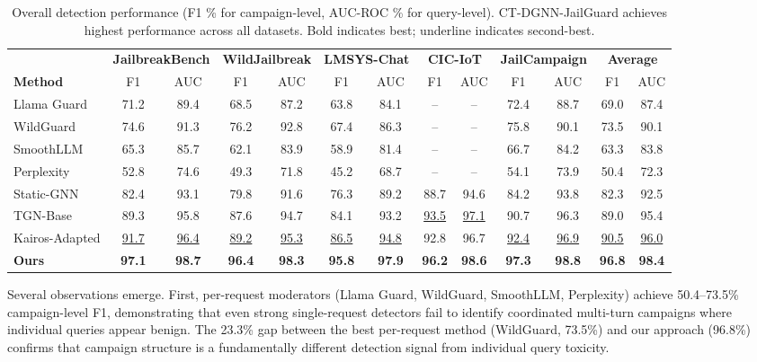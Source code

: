 \documentclass[journal]{IEEEtran}
\theoremstyle{plain}
\theoremstyle{definition}
\theoremstyle{remark}
\begin{document}
\begin{table}[t]
\centering
\caption{Overall detection performance (F1 \% for campaign-level, AUC-ROC \% for query-level). CT-DGNN-JailGuard achieves highest performance across all datasets. Bold indicates best; underline indicates second-best.}
\label{tab:overall_results}
\begin{tabular}{@{}l cc cc cc cc cc cc@{}}
\toprule
& \multicolumn{2}{c}{\textbf{JailbreakBench}} & \multicolumn{2}{c}{\textbf{WildJailbreak}} & \multicolumn{2}{c}{\textbf{LMSYS-Chat}} & \multicolumn{2}{c}{\textbf{CIC-IoT}} & \multicolumn{2}{c}{\textbf{JailCampaign}} & \multicolumn{2}{c}{\textbf{Average}} \\
\cmidrule(lr){2-3}\cmidrule(lr){4-5}\cmidrule(lr){6-7}\cmidrule(lr){8-9}\cmidrule(lr){10-11}\cmidrule(lr){12-13}
\textbf{Method} & F1 & AUC & F1 & AUC & F1 & AUC & F1 & AUC & F1 & AUC & F1 & AUC \\
\midrule
Llama Guard & 71.2 & 89.4 & 68.5 & 87.2 & 63.8 & 84.1 & -- & -- & 72.4 & 88.7 & 69.0 & 87.4 \\
WildGuard & 74.6 & 91.3 & 76.2 & 92.8 & 67.4 & 86.3 & -- & -- & 75.8 & 90.1 & 73.5 & 90.1 \\
SmoothLLM & 65.3 & 85.7 & 62.1 & 83.9 & 58.9 & 81.4 & -- & -- & 66.7 & 84.2 & 63.3 & 83.8 \\
Perplexity & 52.8 & 74.6 & 49.3 & 71.8 & 45.2 & 68.7 & -- & -- & 54.1 & 73.9 & 50.4 & 72.3 \\
Static-GNN & 82.4 & 93.1 & 79.8 & 91.6 & 76.3 & 89.2 & 88.7 & 94.6 & 84.2 & 93.8 & 82.3 & 92.5 \\
TGN-Base & 89.3 & 95.8 & 87.6 & 94.7 & 84.1 & 93.2 & \underline{93.5} & \underline{97.1} & 90.7 & 96.3 & 89.0 & 95.4 \\
Kairos-Adapted & \underline{91.7} & \underline{96.4} & \underline{89.2} & \underline{95.3} & \underline{86.5} & \underline{94.8} & 92.8 & 96.7 & \underline{92.4} & \underline{96.9} & \underline{90.5} & \underline{96.0} \\
\midrule
\textbf{Ours} & \textbf{97.1} & \textbf{98.7} & \textbf{96.4} & \textbf{98.3} & \textbf{95.8} & \textbf{97.9} & \textbf{96.2} & \textbf{98.6} & \textbf{97.3} & \textbf{98.8} & \textbf{96.8} & \textbf{98.4} \\
\bottomrule
\end{tabular}
\end{table}

Several observations emerge. First, per-request moderators (Llama Guard, WildGuard, SmoothLLM, Perplexity) achieve 50.4--73.5\% campaign-level F1, demonstrating that even strong single-request detectors fail to identify coordinated multi-turn campaigns where individual queries appear benign. The 23.3\% gap between the best per-request method (WildGuard, 73.5\%) and our approach (96.8\%) confirms that campaign structure is a fundamentally different detection signal from individual query toxicity.
\end{document}
